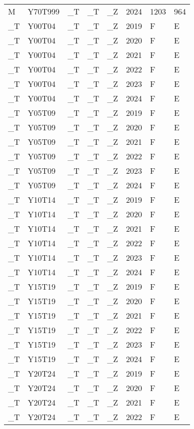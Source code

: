 \begin{longtable}[t]{llllllll}
M & Y70T999 & \_T & \_T & \_Z & 2024 & 1203 & 964\\
\addlinespace
\_T & Y00T04 & \_T & \_T & \_Z & 2019 & F & E\\
\_T & Y00T04 & \_T & \_T & \_Z & 2020 & F & E\\
\_T & Y00T04 & \_T & \_T & \_Z & 2021 & F & E\\
\_T & Y00T04 & \_T & \_T & \_Z & 2022 & F & E\\
\_T & Y00T04 & \_T & \_T & \_Z & 2023 & F & E\\
\addlinespace
\_T & Y00T04 & \_T & \_T & \_Z & 2024 & F & E\\
\_T & Y05T09 & \_T & \_T & \_Z & 2019 & F & E\\
\_T & Y05T09 & \_T & \_T & \_Z & 2020 & F & E\\
\_T & Y05T09 & \_T & \_T & \_Z & 2021 & F & E\\
\_T & Y05T09 & \_T & \_T & \_Z & 2022 & F & E\\
\addlinespace
\_T & Y05T09 & \_T & \_T & \_Z & 2023 & F & E\\
\_T & Y05T09 & \_T & \_T & \_Z & 2024 & F & E\\
\_T & Y10T14 & \_T & \_T & \_Z & 2019 & F & E\\
\_T & Y10T14 & \_T & \_T & \_Z & 2020 & F & E\\
\_T & Y10T14 & \_T & \_T & \_Z & 2021 & F & E\\
\addlinespace
\_T & Y10T14 & \_T & \_T & \_Z & 2022 & F & E\\
\_T & Y10T14 & \_T & \_T & \_Z & 2023 & F & E\\
\_T & Y10T14 & \_T & \_T & \_Z & 2024 & F & E\\
\_T & Y15T19 & \_T & \_T & \_Z & 2019 & F & E\\
\_T & Y15T19 & \_T & \_T & \_Z & 2020 & F & E\\
\addlinespace
\_T & Y15T19 & \_T & \_T & \_Z & 2021 & F & E\\
\_T & Y15T19 & \_T & \_T & \_Z & 2022 & F & E\\
\_T & Y15T19 & \_T & \_T & \_Z & 2023 & F & E\\
\_T & Y15T19 & \_T & \_T & \_Z & 2024 & F & E\\
\_T & Y20T24 & \_T & \_T & \_Z & 2019 & F & E\\
\addlinespace
\_T & Y20T24 & \_T & \_T & \_Z & 2020 & F & E\\
\_T & Y20T24 & \_T & \_T & \_Z & 2021 & F & E\\
\_T & Y20T24 & \_T & \_T & \_Z & 2022 & F & E\\

\end{longtable}
